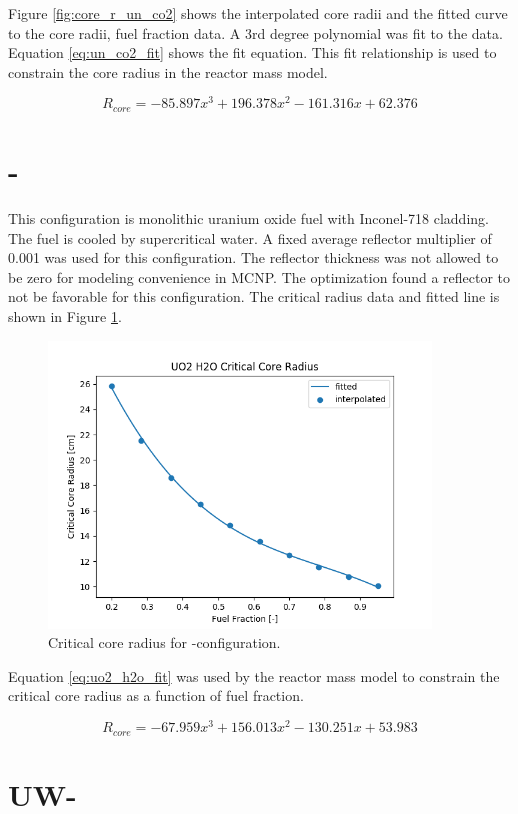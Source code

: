 Figure \ref{fig:core_r_un_co2} shows the interpolated core radii and the fitted
curve to the core radii, fuel fraction data. A 3rd degree polynomial was fit to
the data. Equation \ref{eq:un_co2_fit} shows the fit equation. This fit
relationship is used to constrain the core radius in the reactor mass model.

\begin{equation}
    R_{core} = -85.897x^3 + 196.378x^2 - 161.316x + 62.376
    \label{eq:un_co2_fit}
\end{equation}

\section{\uox-\water}
This configuration is monolithic uranium oxide fuel with Inconel-718 cladding.
The fuel is cooled by supercritical water. A fixed average reflector multiplier
of 0.001 was used for this configuration. The reflector thickness was not
allowed to be zero for modeling convenience in MCNP. The optimization found a
reflector to not be favorable for this configuration. The critical radius data
and fitted line is shown in Figure \ref{fig:core_r_uo2_h2o}.

\begin{figure}[h]
    \centering
    \includegraphics[width=4in]{../images/core_r_uo2_h2o.png}
\caption{Critical core radius for \uox-\water configuration.}
\label{fig:core_r_uo2_h2o}
\end{figure}

Equation \ref{eq:uo2_h2o_fit} was used by the reactor mass model to constrain
the critical core radius as a function of fuel fraction.

\begin{equation}
    R_{core} = -67.959x^3 + 156.013x^2 - 130.251x + 53.983
    \label{eq:uo2_h2o_fit}
\end{equation}


\section{UW-\water}

